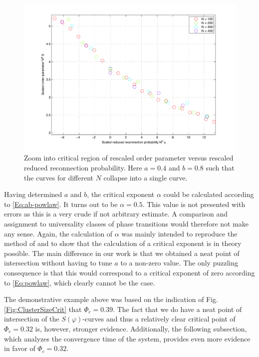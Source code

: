 \documentclass[11pt]{article}
\begin{document}
\begin{figure}[h!]
  \centering
    \includegraphics[scale=0.7]{Plots/SvsPHI2_zoom.pdf}
  \caption{Zoom into critical region of rescaled order parameter versus rescaled reduced reconnection probability. Here $a=0.4$ and $b=0.8$ such that the curves for different $N$ collapse into a single curve.}
  \label{Fig:zoomed2}
\end{figure}

Having determined $a$ and $b$, the critical exponent $\alpha$ could be calculated according to \eqref{Eq:ab-powlaw}. It turns out to be $\alpha=0.5$. This value is not presented with errors as this is a very crude if not arbitrary estimate. A comparison and assignment to universality classes of phase transitions would therefore not make any sense. Again, the calculation of $\alpha$ was mainly intended to reproduce the method of \cite{main paper} and to show that the calculation of a critical exponent is in theory possible. The main difference in our work is that we obtained a neat point of intersection without having to tune $a$ to a non-zero value. The only puzzling consequence is that this would correspond to a critical exponent of zero according to \eqref{Eq:powlaw}, which clearly cannot be the case.

The demonstrative example above was based on the indication of Fig. \ref{Fig:ClusterSizeCrit} that $\Phi_c = 0.39$. The fact that we do have a neat point of intersection of the $S(\varphi)$-curves and thus a relatively clear critical point of $\Phi_c=0.32$ is, however, stronger evidence. Additionally, the following subsection, which analyzes the convergence time of the system, provides even more evidence in favor of $\Phi_c=0.32$.
\end{document}
